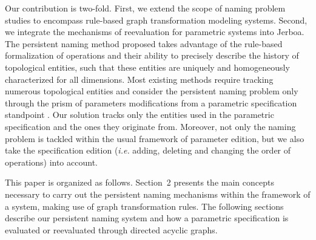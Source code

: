 Our contribution is two-fold. First, we extend the scope of naming
problem studies to encompass rule-based graph transformation modeling systems. Second, we integrate the mechanisms of reevaluation for parametric systems into
Jerboa.
The persistent naming method proposed takes advantage of the 
rule-based formalization of operations and their ability to precisely describe the history of topological entities, such that these entities are uniquely and homogeneously characterized for all dimensions.  Most existing methods require  tracking numerous topological entities and consider the persistent naming problem only through the prism of parameters modifications from a parametric specification standpoint \cite{KRIPAC1997, chen1995editability, wu2001face}. Our solution tracks
only the entities used in the parametric specification and the
ones they originate from. Moreover, not only the naming problem is tackled within the usual framework of  parameter edition, but we also take the specification edition (\textit{i.e.} adding, deleting and changing the order of operations) into account.


This paper is organized as follows. Section~2 presents the main concepts necessary to carry out the persistent naming mechanisms within the framework of a system, making use of graph transformation rules. The following sections describe our persistent naming system and how a parametric specification is evaluated or reevaluated through directed acyclic graphs.

